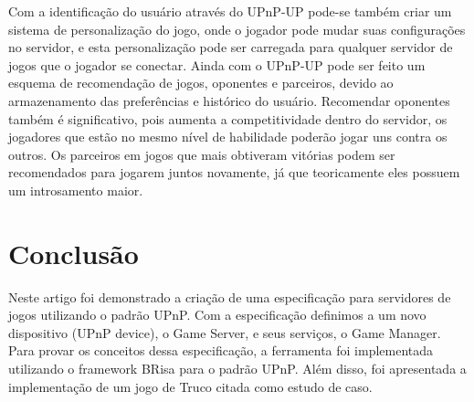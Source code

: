 \documentclass[a4paper]{sbgames}               %
\begin{document}
Com a identificação do usuário através do UPnP-UP pode-se também criar um sistema de personalização do jogo, onde o jogador pode mudar suas configurações no servidor, e esta personalização pode ser carregada para qualquer servidor de jogos que o jogador se conectar. Ainda com o UPnP-UP pode ser feito um esquema de recomendação de jogos, oponentes e parceiros, devido ao armazenamento das preferências e histórico do usuário. Recomendar oponentes também é significativo, pois  aumenta a competitividade dentro do servidor, os jogadores que estão no mesmo nível de habilidade poderão jogar uns contra os outros. Os parceiros em jogos que mais obtiveram vitórias podem ser recomendados para jogarem juntos novamente, já que teoricamente eles possuem um introsamento maior.

\section{Conclusão}
Neste artigo foi demonstrado a criação de uma especificação para servidores de jogos utilizando o padrão UPnP. Com a especificação definimos a um novo dispositivo (UPnP device), o Game Server, e seus serviços, o Game Manager. Para provar os conceitos dessa especificação, a ferramenta foi implementada utilizando o framework BRisa para o padrão UPnP.  Além disso, foi apresentada a implementação de um jogo de Truco citada como estudo de caso.

%
%
\end{document}
